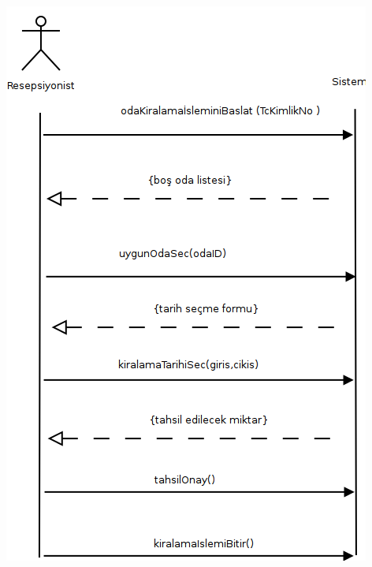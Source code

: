 \documentclass[12pt,a4paper]{report}
\begin{document}
\begin{center}
\includegraphics{dia/ssd-usecase2.png}
\end{center}
\end{document}
